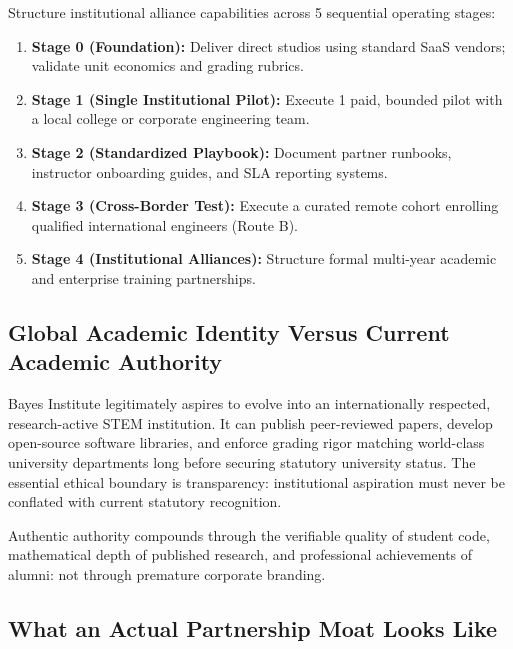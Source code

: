 Structure institutional alliance capabilities across 5 sequential operating stages:
\begin{enumerate}
\item \textbf{Stage 0 (Foundation):} Deliver direct studios using standard SaaS vendors; validate unit economics and grading rubrics.
\item \textbf{Stage 1 (Single Institutional Pilot):} Execute 1 paid, bounded pilot with a local college or corporate engineering team.
\item \textbf{Stage 2 (Standardized Playbook):} Document partner runbooks, instructor onboarding guides, and SLA reporting systems.
\item \textbf{Stage 3 (Cross-Border Test):} Execute a curated remote cohort enrolling qualified international engineers (Route B).
\item \textbf{Stage 4 (Institutional Alliances):} Structure formal multi-year academic and enterprise training partnerships.
\end{enumerate}

\subsection{Global Academic Identity Versus Current Academic Authority}
\label{sec:academic_identity_versus_authority}

Bayes Institute legitimately aspires to evolve into an internationally respected, research-active STEM institution. It can publish peer-reviewed papers, develop open-source software libraries, and enforce grading rigor matching world-class university departments long before securing statutory university status. The essential ethical boundary is transparency: institutional aspiration must never be conflated with current statutory recognition.

Authentic authority compounds through the verifiable quality of student code, mathematical depth of published research, and professional achievements of alumni: not through premature corporate branding.

\subsection{What an Actual Partnership Moat Looks Like}
\label{sec:actual_partnership_moat}

